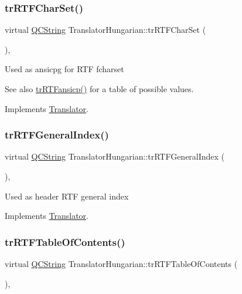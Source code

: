 \subsubsection{\texorpdfstring{trRTFCharSet()}{trRTFCharSet()}}
{\footnotesize\ttfamily virtual \mbox{\hyperlink{class_q_c_string}{Q\+C\+String}} Translator\+Hungarian\+::tr\+R\+T\+F\+Char\+Set (\begin{DoxyParamCaption}{ }\end{DoxyParamCaption})\hspace{0.3cm}{\ttfamily [inline]}, {\ttfamily [virtual]}}

Used as ansicpg for R\+TF fcharset \begin{DoxySeeAlso}{See also}
\mbox{\hyperlink{class_translator_hungarian_aa3e8143837bae2721e36eff9ac36d120}{tr\+R\+T\+Fansicp()}} for a table of possible values. 
\end{DoxySeeAlso}


Implements \mbox{\hyperlink{class_translator_afad391f3cbfb5ce6332b7239f8e2049a}{Translator}}.

\mbox{\label{class_translator_hungarian_a3077462c7ac66e2196d5ccb6a935da87}} 
\subsubsection{\texorpdfstring{trRTFGeneralIndex()}{trRTFGeneralIndex()}}
{\footnotesize\ttfamily virtual \mbox{\hyperlink{class_q_c_string}{Q\+C\+String}} Translator\+Hungarian\+::tr\+R\+T\+F\+General\+Index (\begin{DoxyParamCaption}{ }\end{DoxyParamCaption})\hspace{0.3cm}{\ttfamily [inline]}, {\ttfamily [virtual]}}

Used as header R\+TF general index 

Implements \mbox{\hyperlink{class_translator}{Translator}}.

\mbox{\label{class_translator_hungarian_ae1bfdc207d0a990b84689d1fef9dea81}} 
\subsubsection{\texorpdfstring{trRTFTableOfContents()}{trRTFTableOfContents()}}
{\footnotesize\ttfamily virtual \mbox{\hyperlink{class_q_c_string}{Q\+C\+String}} Translator\+Hungarian\+::tr\+R\+T\+F\+Table\+Of\+Contents (\begin{DoxyParamCaption}{ }\end{DoxyParamCaption})\hspace{0.3cm}{\ttfamily [inline]}, {\ttfamily [virtual]}}

